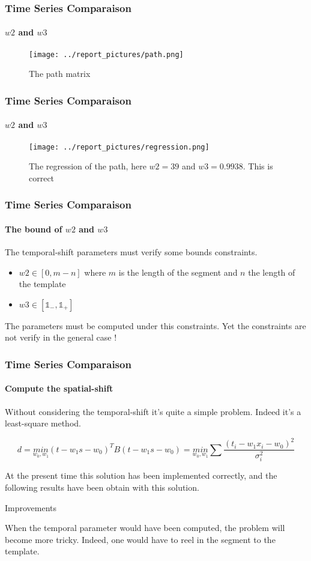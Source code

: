 \documentclass[11pt, sans, handout]{beamer}
\newcommand{\Un}{\mathbb{1}}
\begin{document}
\begin{frame}
	\frametitle{Time Series Comparaison}
	\framesubtitle{$w2$ and $w3$}
	
	\begin{figure}[H]
		\centering
		\texttt{[image: ../report\_pictures/path.png]}
		\caption{The path matrix}
		\label{ex_dist_rep}
	\end{figure}
	
\end{frame}


\begin{frame}
	\frametitle{Time Series Comparaison}
	\framesubtitle{$w2$ and $w3$}
	
	\begin{figure}[H]
		\centering
		\texttt{[image: ../report\_pictures/regression.png]}
		\caption{The regression of the path, here $w2=39$ and $w3=0.9938$. This is correct}
		\label{ex_dist_rep}
	\end{figure}

\end{frame}

\begin{frame}
	\frametitle{Time Series Comparaison}
	\framesubtitle{The bound of $w2$ and $w3$}
	
	The temporal-shift parameters must verify some bounds constraints.
	
	\begin{itemize}
	\item $w2 \in [0, m-n]$ where $m$ is the length of the segment and $n$ the length of the template	
	\item $w3 \in [\Un_{-}, \Un_{+}]$
	

	\end{itemize}
	
	The parameters must be computed under this constraints. Yet the constraints are not verify in the general case ! 
	
\end{frame}

\begin{frame}
	\frametitle{Time Series Comparaison}
	\framesubtitle{Compute the spatial-shift}
	
	Without considering the temporal-shift it's quite a simple problem. Indeed it's a least-square method.
	
	\[ d = \underset{w_0,w_1}{min} (t - w_1 s - w_0)^T B (t - w_1 s - w_0) = \underset{w_0,w_1}{min} \sum \frac{(t_i - w_1 x_i - w_0)^2}{\sigma_i^2} \]
	
	At the present time this solution has been implemented correctly, and the following results have been obtain with this solution.
	
	\begin{exampleblock}{Improvements}
	
	When the temporal parameter would have been computed, the problem will become more tricky. Indeed, one would have to reel in the segment to the template.
	\end{exampleblock}
	
\end{frame}
\end{document}
